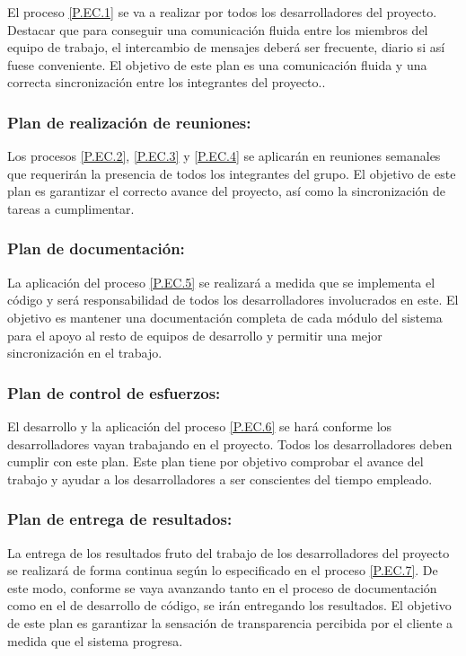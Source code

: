 \documentclass{article}
\begin{document}
El proceso \ref{P.EC.1} se va a realizar por todos los desarrolladores del proyecto. Destacar que para conseguir una comunicación fluida entre los miembros del equipo de trabajo, el intercambio de mensajes deberá ser frecuente, diario si así fuese conveniente.
El objetivo de este plan es una comunicación fluida y una correcta sincronización entre los integrantes del proyecto..

\subsubsection{Plan de realización de reuniones:} \label{PL.EC.2} %

Los procesos \ref{P.EC.2}, \ref{P.EC.3} y \ref{P.EC.4} se aplicarán en reuniones semanales que requerirán la presencia de todos los integrantes del grupo. El objetivo de este plan es garantizar el correcto avance del proyecto, así como la sincronización de tareas a cumplimentar.

\subsubsection{Plan de documentación:} \label{PL.EC.3}

La aplicación del proceso \ref{P.EC.5} se realizará a medida que se implementa el código y será responsabilidad de todos los desarrolladores involucrados en este. El objetivo es mantener una documentación completa de cada módulo del sistema para el apoyo al resto de equipos de desarrollo y permitir una mejor sincronización en el trabajo.

\subsubsection{Plan de control de esfuerzos:} \label{PL.EC.4}

El desarrollo y la aplicación del proceso \ref{P.EC.6} se hará conforme los desarrolladores vayan trabajando en el proyecto. Todos los desarrolladores deben cumplir con este plan. Este plan tiene por objetivo comprobar el avance del trabajo y ayudar a los desarrolladores a ser conscientes del tiempo empleado.

\subsubsection{Plan de entrega de resultados:} \label{PL.EC.5}

La entrega de los resultados fruto del trabajo de los desarrolladores del proyecto se realizará de forma continua según lo especificado en el proceso \ref{P.EC.7}. De este modo, conforme se vaya avanzando tanto en el proceso de documentación como en el de desarrollo de código, se irán entregando los resultados.
El objetivo de este plan es garantizar la sensación de transparencia percibida por el cliente a medida que el sistema progresa.
\end{document}
